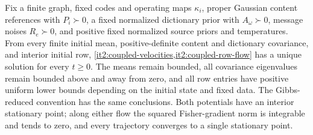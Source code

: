 Fix a finite graph, fixed codes and operating maps $\kappa_i$, proper Gaussian content references with $P_i\succ0$, a fixed normalized dictionary prior with $A_\omega\succ0$, message noises $R_e\succ0$, and positive fixed normalized source priors and temperatures. From every finite initial mean, positive-definite content and dictionary covariance, and interior initial row, \cref{it2:coupled-velocities,it2:coupled-row-flow} has a unique solution for every $t\geq0$. The means remain bounded, all covariance eigenvalues remain bounded above and away from zero, and all row entries have positive uniform lower bounds depending on the initial state and fixed data. The Gibbs-reduced convention has the same conclusions. Both potentials have an interior stationary point; along either flow the squared Fisher-gradient norm is integrable and tends to zero, and every trajectory converges to a single stationary point.
